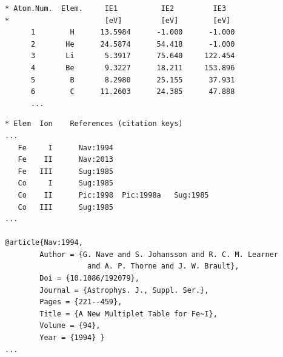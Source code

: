 \documentclass[traditabstract]{aa} %
\begin{document}
\begin{table}
\begin{center}
\caption{Sample of electronic table with first, second, and third ionisation energies for atoms and ions (for H and He, the highest possible ionisation stages are singly and doubly ionised, respectively, and therefore the ionisation energy of higher stages are meaningless and are assigned a value of $-1$ in the table). The full table is available electronically at CDS.}
\label{tab:ionpot}
\scriptsize
\begin{verbatim} 
* Atom.Num.  Elem.     IE1          IE2         IE3 
*                      [eV]         [eV]        [eV]
      1        H      13.5984      -1.000      -1.000
      2       He      24.5874      54.418      -1.000
      3       Li       5.3917      75.640     122.454
      4       Be       9.3227      18.211     153.896
      5        B       8.2980      25.155      37.931
      6        C      11.2603      24.385      47.888
      ...
\end{verbatim}
\end{center}
\end{table} 

\begin{table}
\begin{center}
\caption{Sample of electronic table with the list of references for atomic energy level data, ion by ion. The citation keys in the table are abbreviations of the full references, which are also made available electronically in {\sc Bib}{\TeX} format. The full table is available electronically at CDS.}
\label{tab:atomrefs}
\scriptsize
\begin{verbatim}
* Elem  Ion    References (citation keys)
...
   Fe     I      Nav:1994
   Fe    II      Nav:2013
   Fe   III      Sug:1985
   Co     I      Sug:1985
   Co    II      Pic:1998  Pic:1998a   Sug:1985
   Co   III      Sug:1985
...

@article{Nav:1994,
        Author = {G. Nave and S. Johansson and R. C. M. Learner 
                   and A. P. Thorne and J. W. Brault},
        Doi = {10.1086/192079},
        Journal = {Astrophys. J., Suppl. Ser.},
        Pages = {221--459},
        Title = {A New Multiplet Table for Fe~I},
        Volume = {94},
        Year = {1994} }
...
        
\end{verbatim}
\end{center}
\end{table} 
\end{document}
